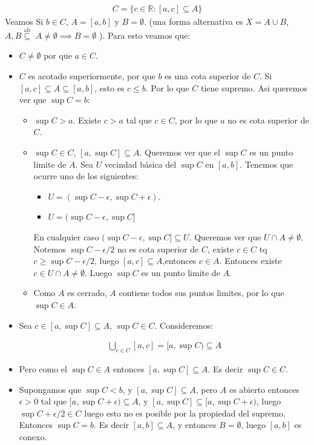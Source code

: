 \begin{enumerate}[label=(\Roman*)]
  \begin{align*}
  C= \{c\in \mathbb R: [a,c] \subseteq A\}
  \end{align*}
  Veamos Si $b\in C$, $A = [a,b]$ y $B = \emptyset$. (una forma alternativa es $X =A \cup B$, $A,B \overset{\text{ab}}\subseteq$ $A\neq \emptyset \implies B =\emptyset$ ). Para esto veamos que:
  \begin{itemize}
    \item $C \neq \emptyset$ por que $a\in C$.
    \item $C$ es acotado superiormente, por que $b$ es una cota superior de $C$. Si $[a,c] \subseteq A\subseteq [a,b]$, esto es $c\leq b$. Por lo que $C$ tiene  supremo. Asi queremos ver que $\sup C = b$:
    \begin{itemize}
      \item  $\sup C >a$. Existe $c>a$ tal que $c \in C$, por lo que $a$ no es cota superior de $C$.
      \item $\sup C \in C$, $[a,\sup C] \subseteq A$. Queremos ver que el $\sup C$ es un punto limite de $A$. Sea $U$ vecindad básica del $\sup C$ en $[a,b]$. Tenemos que ocurre uno de los siguientes:
      \begin{itemize}
        \item $U = (\sup C - \epsilon, \sup C + \epsilon)$.
        \item $U = (\sup C - \epsilon, \sup C]$
      \end{itemize}
      En cualquier caso $(\sup C - \epsilon, \sup C] \subseteq U$. Queremos ver que $U \cap A \neq \emptyset$. Notemos $\sup C - \epsilon/2$ no es cota superior de $C$, existe $c \in C$ tq $c\geq \sup C - \epsilon/2$, luego $[a,c] \subseteq A$,entonces $c \in A$. Entonces existe $c \in U \cap A \neq \emptyset$. Luego $\sup C$ es un punto limite de $A$.
      \item Como $A$ es cerrado, $A$ contiene todos sus puntos limites, por lo que $\sup C \in A$.
    \end{itemize}
    \item Sea $c \in [a,\sup C] \subseteq A$, $\sup C \in C$. Consideremos:
    
    \begin{align*}
    \bigcup_{c \in C} [a,c] = [a,\sup C) \subseteq A
    \end{align*}
    
    
    \item Pero como el $\sup C \in A$ entonces $[a,\sup C] \subseteq A$. Es decir $\sup C \in C$. 
    \item Supongamos que $\sup C < b$, y $[a, \sup C] \subseteq A$, pero $A$ es abierto entonces $\epsilon > 0$ tal que $[a, \sup C + \epsilon) \subseteq A$, y $[a,\sup C] \subseteq [a,\sup C + \epsilon)$, luego  $\sup C + \epsilon/2 \in C$ luego esto no es posible por la propiedad del supremo.  Entonces $\sup C = b$. Es decir $[a,b] \subseteq A$, y entonces $B = \emptyset$, luego $[a,b]$ es conexo.
    
  \end{itemize}

\end{enumerate}


